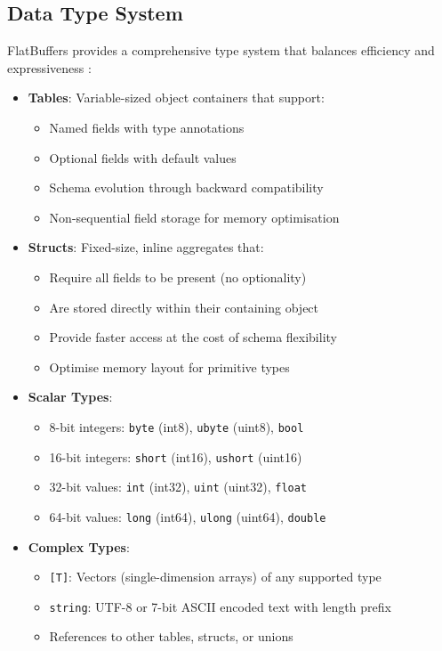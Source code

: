 \subsection{Data Type System}
\label{rw_tb:fb:data_type_system}

FlatBuffers provides a comprehensive type system that balances efficiency and expressiveness \citep{flatbuffers_data_types}:

\begin{itemize}
  \item \textbf{Tables}: Variable-sized object containers that support:
    \begin{itemize}
      \item Named fields with type annotations
      \item Optional fields with default values
      \item Schema evolution through backward compatibility
      \item Non-sequential field storage for memory optimisation
    \end{itemize}

  \item \textbf{Structs}: Fixed-size, inline aggregates that:
    \begin{itemize}
      \item Require all fields to be present (no optionality)
      \item Are stored directly within their containing object
      \item Provide faster access at the cost of schema flexibility
      \item Optimise memory layout for primitive types
    \end{itemize}

  \item \textbf{Scalar Types}:
    \begin{itemize}
      \item 8-bit integers: \texttt{byte} (int8), \texttt{ubyte} (uint8), \texttt{bool}
      \item 16-bit integers: \texttt{short} (int16), \texttt{ushort} (uint16)
      \item 32-bit values: \texttt{int} (int32), \texttt{uint} (uint32), \texttt{float}
      \item 64-bit values: \texttt{long} (int64), \texttt{ulong} (uint64), \texttt{double}
    \end{itemize}

  \item \textbf{Complex Types}:
    \begin{itemize}
      \item \texttt{[T]}: Vectors (single-dimension arrays) of any supported type
      \item \texttt{string}: UTF-8 or 7-bit ASCII encoded text with length prefix
      \item References to other tables, structs, or unions
    \end{itemize}


\end{itemize}
